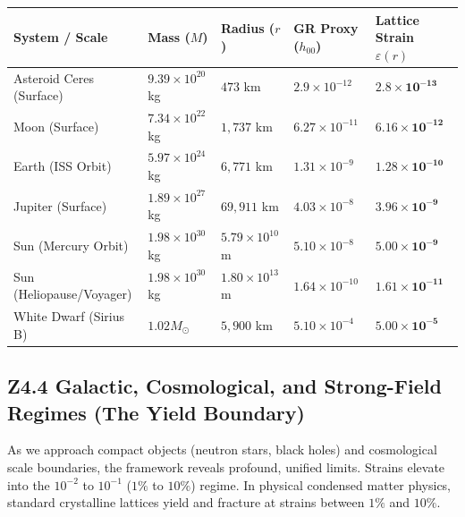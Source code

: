 \documentclass[11pt, letterpaper, openany]{book}
\begin{document}
\begin{center}
\renewcommand{\arraystretch}{1.2}
\small
\begin{tabular}{|p{3.5cm}|p{2cm}|p{2.5cm}|p{2.2cm}|p{2.5cm}|}
\hline
\rowcolor{kishblue!12}
\textbf{System / Scale} & \textbf{Mass ($M$)} & \textbf{Radius ($r$)} & \textbf{GR Proxy ($h_{00}$)} & \textbf{Lattice Strain $\varepsilon(r)$} \\
\hline
Asteroid Ceres (Surface) & $9.39 \times 10^{20}$ kg & $473$ km & $2.9 \times 10^{-12}$ & $\mathbf{2.8 \times 10^{-13}}$ \\
\hline
Moon (Surface) & $7.34 \times 10^{22}$ kg & $1,737$ km & $6.27 \times 10^{-11}$ & $\mathbf{6.16 \times 10^{-12}}$ \\
\hline
Earth (ISS Orbit) & $5.97 \times 10^{24}$ kg & $6,771$ km & $1.31 \times 10^{-9}$ & $\mathbf{1.28 \times 10^{-10}}$ \\
\hline
Jupiter (Surface) & $1.89 \times 10^{27}$ kg & $69,911$ km & $4.03 \times 10^{-8}$ & $\mathbf{3.96 \times 10^{-9}}$ \\
\hline
Sun (Mercury Orbit) & $1.98 \times 10^{30}$ kg & $5.79 \times 10^{10}$ m & $5.10 \times 10^{-8}$ & $\mathbf{5.00 \times 10^{-9}}$ \\
\hline
Sun (Heliopause/Voyager) & $1.98 \times 10^{30}$ kg & $1.80 \times 10^{13}$ m & $1.64 \times 10^{-10}$ & $\mathbf{1.61 \times 10^{-11}}$ \\
\hline
White Dwarf (Sirius B) & $1.02 M_\odot$ & $5,900$ km & $5.10 \times 10^{-4}$ & $\mathbf{5.00 \times 10^{-5}}$ \\
\hline
\end{tabular}
\end{center}

\subsection*{Z4.4 Galactic, Cosmological, and Strong-Field Regimes (The Yield Boundary)}

As we approach compact objects (neutron stars, black holes) and cosmological scale boundaries, the framework reveals profound, unified limits. Strains elevate into the $10^{-2}$ to $10^{-1}$ ($1\%$ to $10\%$) regime. In physical condensed matter physics, standard crystalline lattices yield and fracture at strains between $1\%$ and $10\%$.
\end{document}
